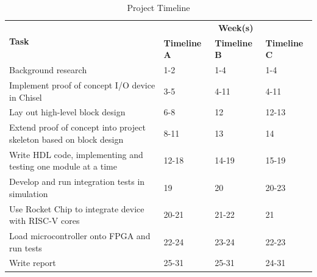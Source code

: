 \begin{table}[ht!]
    \centering
    \begin{tabular}{|p{}|p{}|p{}|p{}|}
        \hline
        \multirow{2}{*}{\textbf{Task}}                                      & \multicolumn{3}{c|}{\textbf{Week(s)}}                                             \\ \cline{2-4}
                                                                            & \textbf{Timeline A}                   & \textbf{Timeline B} & \textbf{Timeline C} \\ \hline
        Background research                                                 & 1-2                                   & 1-4                 & 1-4                 \\ \hline
        Implement proof of concept I/O device in Chisel                     & 3-5                                   & 4-11                & 4-11                \\ \hline
        Lay out high-level block design                                     & 6-8                                   & 12                  & 12-13               \\ \hline
        Extend proof of concept into project skeleton based on block design & 8-11                                  & 13                  & 14                  \\ \hline
        Write HDL code, implementing and testing one module at a time       & 12-18                                 & 14-19               & 15-19               \\ \hline
        Develop and run integration tests in simulation                     & 19                                    & 20                  & 20-23               \\ \hline
        Use Rocket Chip to integrate device with RISC-V cores               & 20-21                                 & 21-22               & 21                  \\ \hline
        Load microcontroller onto FPGA and run tests                        & 22-24                                 & 23-24               & 22-23               \\ \hline
        Write report                                                        & 25-31                                 & 25-31               & 24-31               \\ \hline
    \end{tabular}
    \caption{Project Timeline}
    \label{tab:timeline}
\end{table}


